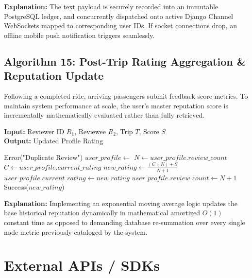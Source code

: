 \textbf{Explanation:} The text payload is securely recorded into an immutable PostgreSQL ledger, and concurrently dispatched onto active Django Channel WebSockets mapped to corresponding user IDs. If socket connections drop, an offline mobile push notification triggers seamlessly.

\subsection{Algorithm 15: Post-Trip Rating Aggregation \& Reputation Update}

Following a completed ride, arriving passengers submit feedback score metrics. To maintain system performance at scale, the user’s master reputation score is incrementally mathematically evaluated rather than fully retrieved.

\begin{algorithm}[H]
\small
\caption{Reputation  Rating Aggregation}
\textbf{Input:} Reviewer ID $R_1$, Reviewee $R_2$, Trip $T$, Score $S$ \\
\textbf{Output:} Updated Profile Rating
\begin{algorithmic}[1]
        \State \Return Error("Duplicate Review")
    \EndIf
    \State {}
    \State $user\_profile \gets$ 
    \State $N \gets user\_profile.review\_count$
    \State $C \gets user\_profile.current\_rating$
    \State $new\_rating \gets \frac{(C \times N) + S}{N + 1}$
    \State $user\_profile.current\_rating \gets new\_rating$
    \State $user\_profile.review\_count \gets N + 1$
    \State {}
    \State \Return Success($new\_rating$)
\EndFunction
\end{algorithmic}
\end{algorithm}

\textbf{Explanation:} Implementing an exponential moving average logic updates the base historical reputation dynamically in mathematical amortized $O(1)$ constant time as opposed to demanding database re-summation over every single node metric previously cataloged by the system.


\section{External APIs / SDKs}

